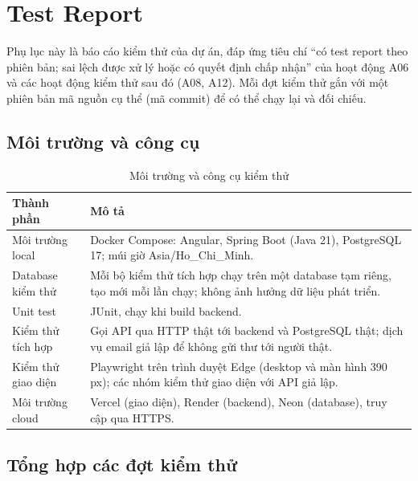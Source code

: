 \section{Test Report}
\label{sec:test-report}

Phụ lục này là báo cáo kiểm thử của dự án, đáp ứng tiêu chí ``có test report theo phiên bản; sai lệch được xử lý hoặc có quyết định chấp nhận'' của hoạt động A06 và các hoạt động kiểm thử sau đó (A08, A12). Mỗi đợt kiểm thử gắn với một phiên bản mã nguồn cụ thể (mã commit) để có thể chạy lại và đối chiếu.

\subsection{Môi trường và công cụ}

\begin{table}[H]
\centering\small
\caption{Môi trường và công cụ kiểm thử}\label{tab:tr-env}
\begin{tabularx}{\linewidth}{@{}p{.24\linewidth}X@{}}
\toprule
\textbf{Thành phần} & \textbf{Mô tả}\\\midrule
Môi trường local & Docker Compose: Angular, Spring Boot (Java 21), PostgreSQL 17; múi giờ Asia/Ho\_Chi\_Minh.\\
Database kiểm thử & Mỗi bộ kiểm thử tích hợp chạy trên một database tạm riêng, tạo mới mỗi lần chạy; không ảnh hưởng dữ liệu phát triển.\\
Unit test & JUnit, chạy khi build backend.\\
Kiểm thử tích hợp & Gọi API qua HTTP thật tới backend và PostgreSQL thật; dịch vụ email giả lập để không gửi thư tới người thật.\\
Kiểm thử giao diện & Playwright trên trình duyệt Edge (desktop và màn hình 390 px); các nhóm kiểm thử giao diện với API giả lập.\\
Môi trường cloud & Vercel (giao diện), Render (backend), Neon (database), truy cập qua HTTPS.\\
\bottomrule
\end{tabularx}
\end{table}

\subsection{Tổng hợp các đợt kiểm thử}

